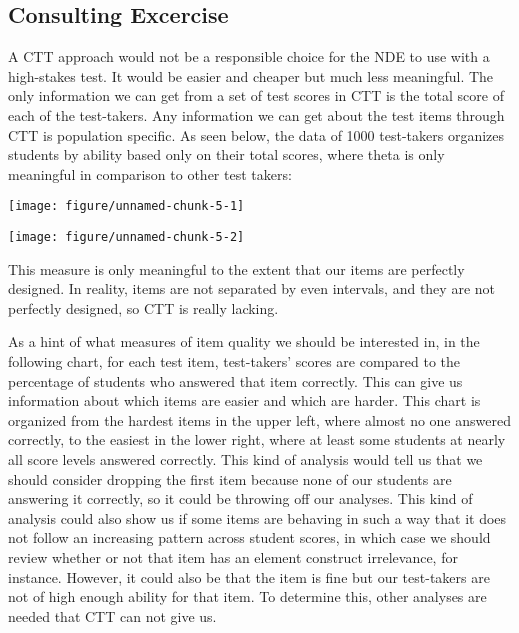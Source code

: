 \documentclass{article}\usepackage[]{graphicx}\usepackage[]{color}
\newenvironment{knitrout}{}{} %
\begin{document}
\begin{enumerate}
\section*{Consulting Excercise}

A CTT approach would not be a responsible choice for the NDE to use with a high-stakes test. It would be easier and cheaper but much less meaningful. The only information we can get from a set of test scores in CTT is the total score of each of the test-takers. Any information we can get about the test items through CTT is population specific. As seen below, the data of 1000 test-takers organizes students by ability based only on their total scores, where theta is only meaningful in comparison to other test takers:

\centering
\begin{knitrout}
\color{fgcolor}

{\centering \texttt{[image: figure/unnamed-chunk-5-1]} 

}




{\centering \texttt{[image: figure/unnamed-chunk-5-2]} 

}



\end{knitrout}
\raggedright
This measure is only meaningful to the extent that our items are perfectly designed. In reality, items are not separated by even intervals, and they are not perfectly designed, so CTT is really lacking. 

As a hint of what measures of item quality we should be interested in, in the following chart, for each test item, test-takers' scores are compared to the percentage of students who answered that item correctly. This can give us information about which items are easier and which are harder. This chart is organized from the hardest items in the upper left, where almost no one answered correctly, to the easiest in the lower right, where at least some students at nearly all score levels answered correctly. This kind of analysis would tell us that we should consider dropping the first item because none of our students are answering it correctly, so it could be throwing off our analyses. This kind of analysis could also show us if some items are behaving in such a way that it does not follow an increasing pattern across student scores, in which case we should review whether or not that item has an element construct irrelevance, for instance. However, it could also be that the item is fine but our test-takers are not of high enough ability for that item. To determine this, other analyses are needed that CTT can not give us.


\end{enumerate}
\end{document}

